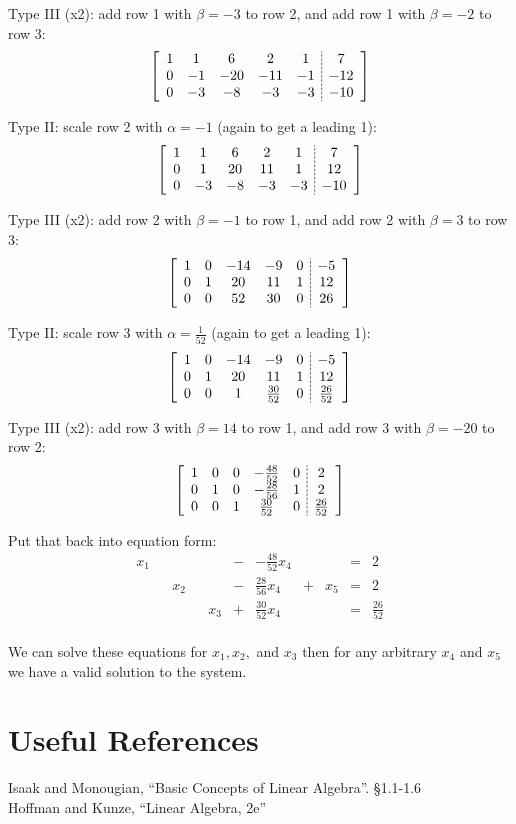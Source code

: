 Type III (x2): add row 1 with $\beta=-3$ to row 2, and add row 1 with $\beta=-2$ to row 3:
\[\left[\begin{array}{ccccc;{2pt/1pt}c} 
1 & 1 & 6 & 2 &  1 & 7\\
0 & -1 & -20 & -11 &  -1 & -12\\
0 & -3 & -8 & -3 & -3 & -10\\
\end{array}\right]\]

Type II: scale row 2 with $\alpha=-1$ (again to get a leading 1):
\[\left[\begin{array}{ccccc;{2pt/1pt}c} 
1 & 1 & 6 & 2 &  1 & 7\\
0 & 1 & 20 & 11 &  1 & 12\\
0 & -3 & -8 & -3 & -3 & -10\\
\end{array}\right]\]

Type III (x2): add row 2 with $\beta=-1$ to row 1, and add row 2 with $\beta=3$ to row 3:
\[\left[\begin{array}{ccccc;{2pt/1pt}c} 
1 & 0 & -14 & -9 &  0 & -5\\
0 & 1 & 20 & 11 &  1 & 12\\
0 & 0 & 52 & 30 & 0 & 26\\
\end{array}\right]\]


Type II: scale row 3 with $\alpha=\frac{1}{52}$ (again to get a leading 1):
\[\left[\begin{array}{ccccc;{2pt/1pt}c} 
1 & 0 & -14 & -9 &  0 & -5\\
0 & 1 & 20 & 11 &  1 & 12\\
0 & 0 & 1 & \frac{30}{52} & 0 & \frac{26}{52}\\
\end{array}\right]\]

Type III (x2): add row 3 with $\beta=14$ to row 1, and add row 3 with $\beta=-20$ to row 2:
\[\left[\begin{array}{ccccc;{2pt/1pt}c} 
1 & 0 & 0 & -\frac{48}{52} &  0 & 2\\
0 & 1 & 0 & -\frac{28}{56} &  1 & 2\\
0 & 0 & 1 & \frac{30}{52} & 0 & \frac{26}{52}\\
\end{array}\right]\]

Put that back into equation form:
\[\begin{array}{rcrcrcrcrcr}
x_1 &  & & &  & - & -\frac{48}{52}x_4 &  & & = & 2\\
&  & x_2 & &  & - & \frac{28}{56} x_4 & + & x_5 & = & 2\\
&  & &  & x_3 & + & \frac{30}{52}x_4 &  & & = & \frac{26}{52}\\
\end{array}\]

We can solve these equations for $x_1, x_2,$ and $x_3$ then for any arbitrary $x_4$ and $x_5$ we have a valid solution to the system. 


\section*{Useful References}
Isaak and Monougian, ``Basic Concepts of Linear Algebra''. \S 1.1-1.6\\
Hoffman and Kunze, ``Linear Algebra, 2e''


